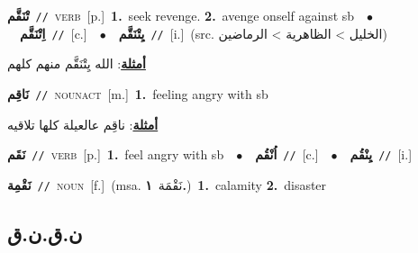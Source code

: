 \documentclass[10pt,a4paper,twoside]{article} %
\begin{document}
\begin{multicols}{2}
{\setlength\topsep{0pt}\textbf{\foreignlanguage{arabic}{تْنَقَّم}}\ {\color{gray}\texttt{//}\color{black}}\ \textsc{verb}\ [p.]\ \textbf{1.}~seek revenge.  \textbf{2.}~avenge onself against sb\ \ $\bullet$\ \ \setlength\topsep{0pt}\textbf{\foreignlanguage{arabic}{اِتْنَقَّم}}\ {\color{gray}\texttt{//}\color{black}}\ [c.]\ \ $\bullet$\ \ \setlength\topsep{0pt}\textbf{\foreignlanguage{arabic}{يِتْنَقَّم}}\ {\color{gray}\texttt{//}\color{black}}\ [i.]\ (src. \color{gray}\foreignlanguage{arabic}{الخليل > الظاهرية > الرماضين}\color{black})\  \begin{flushright}\color{gray}\foreignlanguage{arabic}{\textbf{\underline{\foreignlanguage{arabic}{أمثلة}}}: الله يِتْنَقَّم منهم كلهم}\end{flushright}\color{black}} \vspace{2mm}

{\setlength\topsep{0pt}\textbf{\foreignlanguage{arabic}{نَاقِم}}\ {\color{gray}\texttt{//}\color{black}}\ \textsc{noun\textunderscore act}\ [m.]\ \textbf{1.}~feeling angry with sb\  \begin{flushright}\color{gray}\foreignlanguage{arabic}{\textbf{\underline{\foreignlanguage{arabic}{أمثلة}}}: ناقِم عالعيلة كلها تلاقيه}\end{flushright}\color{black}} \vspace{2mm}

{\setlength\topsep{0pt}\textbf{\foreignlanguage{arabic}{نَقَم}}\ {\color{gray}\texttt{//}\color{black}}\ \textsc{verb}\ [p.]\ \textbf{1.}~feel angry with sb\ \ $\bullet$\ \ \setlength\topsep{0pt}\textbf{\foreignlanguage{arabic}{اُنْقُم}}\ {\color{gray}\texttt{//}\color{black}}\ [c.]\ \ $\bullet$\ \ \setlength\topsep{0pt}\textbf{\foreignlanguage{arabic}{يِنْقُم}}\ {\color{gray}\texttt{//}\color{black}}\ [i.]\ } \vspace{2mm}

{\setlength\topsep{0pt}\textbf{\foreignlanguage{arabic}{نَقْمِة}}\ {\color{gray}\texttt{//}\color{black}}\ \textsc{noun}\ [f.]\ \color{gray}(msa. \foreignlanguage{arabic}{نَقْمَة}~\foreignlanguage{arabic}{\textbf{١.}})\color{black}\ \textbf{1.}~calamity  \textbf{2.}~disaster\ } \vspace{2mm}

\vspace{-3mm}
\subsection*{\color{blue}\foreignlanguage{arabic}{ن.ق.ن.ق}\color{blue}{}} 


\end{multicols}
\end{document}
